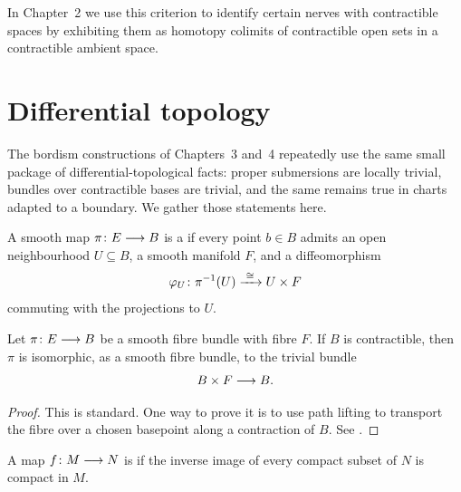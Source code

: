 \begin{remark}
    In Chapter~2 we use this criterion to identify certain nerves with contractible spaces by exhibiting them as homotopy colimits of contractible open sets in a contractible ambient space.
\end{remark}

\section{Differential topology}

The bordism constructions of Chapters~3 and~4 repeatedly use the same small package of differential-topological facts: proper submersions are locally trivial, bundles over contractible bases are trivial, and the same remains true in charts adapted to a boundary. We gather those statements here.

\begin{definition}\label{ap:: def: smooth fibration}
    A smooth map $\pi \colon E \longrightarrow B$ is a  if every point $b\in B$ admits an open neighbourhood $U\subseteq B$, a smooth manifold $F$, and a diffeomorphism
    \begin{equation}
        \varphi_{U}\colon \pi^{-1}(U) \xrightarrow{\,\,\cong\,\,} U\times F
    \end{equation}
    commuting with the projections to $U$.
\end{definition}

\begin{proposition}\label{ap:: prop: triviality contractibility}
    Let $\pi\colon E \longrightarrow B$ be a smooth fibre bundle with fibre $F$. If $B$ is contractible, then $\pi$ is isomorphic, as a smooth fibre bundle, to the trivial bundle
    \begin{equation}
        B\times F \longrightarrow B.
    \end{equation}
\end{proposition}
\begin{proof}
    This is standard. One way to prove it is to use path lifting to transport the fibre over a chosen basepoint along a contraction of $B$. See \cite[Corollary~10.3]{Hu94}.
\end{proof}

\begin{definition}\label{ap:: def: proper map}
    A map $f\colon M \longrightarrow N$ is  if the inverse image of every compact subset of $N$ is compact in $M$.
\end{definition}

